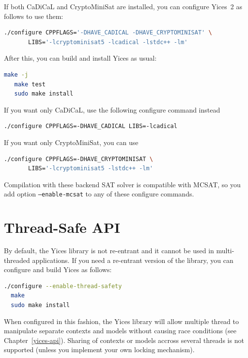 \documentclass[11pt,twoside,fleqn,openright,titlepage]{cslreport}
\begin{document}
If both CaDiCaL and CryptoMiniSat are installed, you can configure Yices~2 as follows to use them:
\begin{small}
\begin{lstlisting}[language=sh]
  ./configure CPPFLAGS='-DHAVE_CADICAL -DHAVE_CRYPTOMINISAT' \
       LIBS='-lcryptominisat5 -lcadical -lstdc++ -lm'
\end{lstlisting}
\end{small}
After this, you can build and install Yices as usual:
\begin{small}
\begin{lstlisting}[language=sh,deletekeywords={test}]
   make -j
   make test
   sudo make install
\end{lstlisting}
\end{small}
If you want only CaDiCaL, use the following configure command instead
\begin{small}
\begin{lstlisting}[language=sh]
  ./configure CPPFLAGS=-DHAVE_CADICAL LIBS=-lcadical
\end{lstlisting}
\end{small}
If you want only CryptoMiniSat, you can use
\begin{small}
\begin{lstlisting}[language=sh]
  ./configure CPPFLAGS=-DHAVE_CRYPTOMINISAT \
       LIBS='-lcryptominisat5 -lstdc++ -lm'
\end{lstlisting}
\end{small}
Compilation with these backend SAT solver is compatible with MCSAT, so
you add option \texttt{--enable-mcsat} to any of these configure commands.

\section{Thread-Safe API}

By default, the Yices library is not re-entrant and it cannot be used
in multi-threaded applications. If you need a re-entrant version of
the library, you can configure and build Yices as follows:
\begin{small}
\begin{lstlisting}[language=sh]
  ./configure --enable-thread-safety
  make
  sudo make install
\end{lstlisting}
\end{small}
When configured in this fashion, the Yices library will allow multiple
thread to manipulate separate contexts and models without causing race
conditions (see Chapter~\ref{yices-api}). Sharing of contexts or
models accross several threads is not supported (unless you implement
your own locking mechanism).
\end{document}
